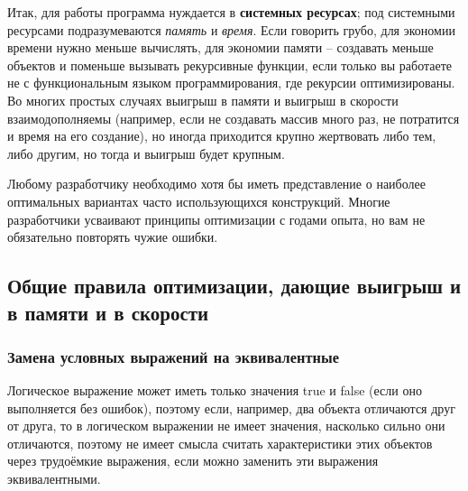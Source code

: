 \documentclass[a4paper, 12pt]{article}
\begin{document}
Итак,  для работы программа нуждается в {\bf системных ресурсах}; под системными ресурсами подразумеваются {\it память} и {\it время}. Если говорить грубо, для экономии времени нужно меньше вычислять, для экономии памяти -- создавать меньше объектов и поменьше вызывать рекурсивные функции, если только вы работаете не с функциональным языком программирования, где рекурсии оптимизированы. Во многих простых случаях выигрыш в памяти и выигрыш в скорости взаимодополняемы (например, если не создавать массив много раз, не потратится и время на его создание), но иногда приходится крупно жертвовать либо тем, либо другим, но тогда и выигрыш будет крупным.

Любому разработчику необходимо хотя бы иметь представление о наиболее оптимальных вариантах часто использующихся конструкций.
Многие разработчики усваивают принципы оптимизации с годами опыта, но вам не обязательно повторять чужие ошибки. 

\subsection{Общие правила оптимизации, дающие выигрыш и в памяти и в скорости}

\subsubsection{Замена условных выражений на эквивалентные}
Логическое выражение может иметь только значения true и false (если оно выполняется без ошибок), поэтому если, например, два объекта отличаются друг от друга, то в логическом выражении не имеет значения, насколько сильно они отличаются, поэтому не имеет смысла считать характеристики этих объектов через трудоёмкие выражения, если можно заменить эти выражения эквивалентными.
\end{document}
